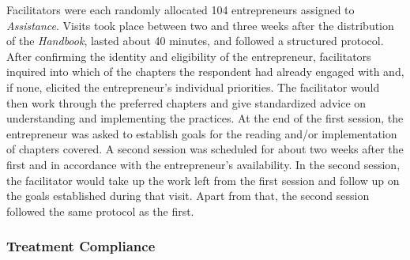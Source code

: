 \documentclass[11.5pt]{article}
\begin{document}
Facilitators were each randomly allocated 104 entrepreneurs assigned to \emph{Assistance}. Visits took place between two and three weeks after the distribution of the \emph{Handbook}, lasted about 40 minutes, and followed a structured protocol. After confirming the identity and eligibility of the entrepreneur, facilitators inquired into which of the chapters the respondent had already engaged with and, if none, elicited the entrepreneur's individual priorities. The facilitator would then work through the preferred chapters and give standardized advice on understanding and implementing the practices. %
At the end of the first session, the entrepreneur was asked to establish goals for the reading and/or implementation of chapters covered. A second session was scheduled for about two weeks after the first and in accordance with the entrepreneur's availability. In the second session, the facilitator would take up the work left from the first session and follow up on the goals established during that visit. Apart from that, the second session followed the same protocol as the first.

\subsubsection{Treatment Compliance}
\end{document}
